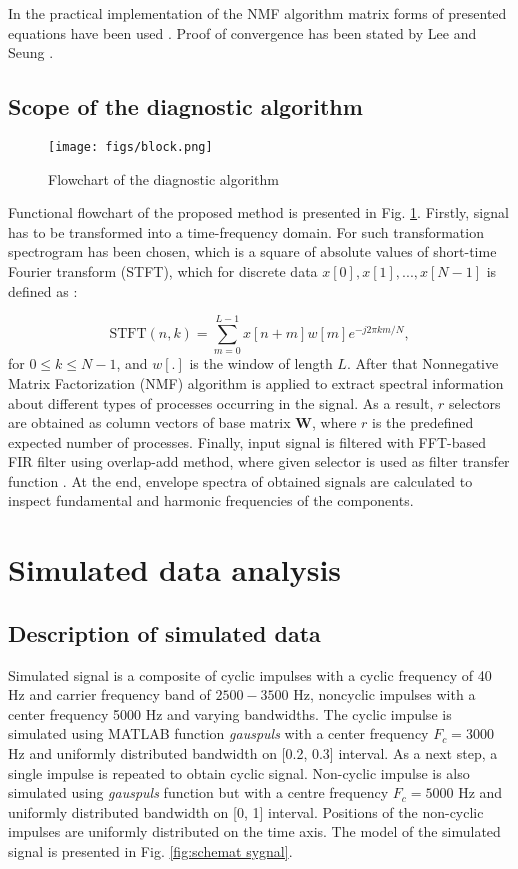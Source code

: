 \documentclass[conference,a4paper]{IEEEtran}
\begin{document}
In the practical implementation of the NMF algorithm matrix forms of presented equations have been used \cite{hoyer2004non}. Proof of convergence has been stated by Lee and Seung \cite{lee2001algorithms}. 

\subsection{Scope of the diagnostic algorithm}
\begin{figure}[!ht]
\centering
\texttt{[image: figs/block.png]}
\caption{Flowchart of the diagnostic algorithm}
\label{fig: block}
\end{figure}

Functional flowchart of the proposed method is presented in Fig. \ref{fig: block}. Firstly, signal has to be transformed into a time-frequency domain. For such transformation spectrogram has been chosen, which is a square of absolute values of short-time Fourier transform (STFT), which for discrete data $x[0], x[1], ... , x[N-1]$ is defined as \cite{alan1989discrete}:

\begin{equation}
    \textrm{STFT}(n,k)=\sum_{m=0}^{L-1}x[n+m]w[m]e^{-j2\pi km/N},
\end{equation}
for $0\leq k \leq N-1$, and $w[.]$ is the window of length $L$. After that Nonnegative Matrix Factorization (NMF) algorithm is applied to extract spectral information about different types of processes occurring in the signal. As a result, $r$ selectors are obtained as column vectors of base matrix {\bf W}, where $r$ is the predefined expected number of processes. Finally, input signal is filtered with FFT-based FIR filter using overlap-add method, where given selector is used as filter transfer function \cite{alan1989discrete}. At the end, envelope spectra of obtained signals are calculated to inspect fundamental and harmonic frequencies of the components.

\section{Simulated data analysis}
\label{sec:sim data}
\subsection{Description of simulated data}

Simulated signal is a composite of cyclic impulses with a cyclic frequency of
40 Hz and carrier frequency band of $2500-3500$ Hz, noncyclic
impulses with a center frequency 5000 Hz and varying
bandwidths. The cyclic impulse is simulated using MATLAB
function \emph{gauspuls} with a center frequency $F_c = 3000$ Hz
and uniformly distributed bandwidth on
[0.2, 0.3] interval. As a next step, a single impulse is repeated to obtain cyclic signal. Non-cyclic impulse is also simulated using \emph{gauspuls} function
but with a centre frequency $F_c = 5000$ Hz and uniformly distributed bandwidth on [0, 1] interval. Positions of the non-cyclic impulses are uniformly distributed
on the time axis. The model of the simulated signal is presented in Fig. \ref{fig:schemat sygnal}.
\end{document}
